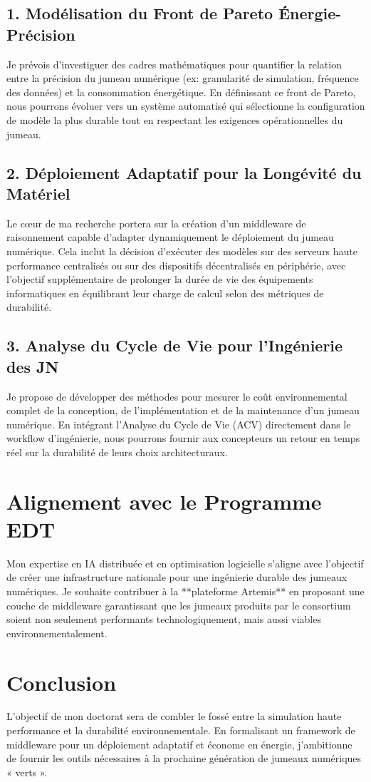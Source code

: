 \documentclass[11pt,a4paper]{article}
\begin{document}
\subsection{1. Modélisation du Front de Pareto Énergie-Précision}
Je prévois d'investiguer des cadres mathématiques pour quantifier la relation entre la précision du jumeau numérique (ex: granularité de simulation, fréquence des données) et la consommation énergétique. En définissant ce front de Pareto, nous pourrons évoluer vers un système automatisé qui sélectionne la configuration de modèle la plus durable tout en respectant les exigences opérationnelles du jumeau.

\subsection{2. Déploiement Adaptatif pour la Longévité du Matériel}
Le cœur de ma recherche portera sur la création d'un middleware de raisonnement capable d'adapter dynamiquement le déploiement du jumeau numérique. Cela inclut la décision d'exécuter des modèles sur des serveurs haute performance centralisés ou sur des dispositifs décentralisés en périphérie, avec l'objectif supplémentaire de prolonger la durée de vie des équipements informatiques en équilibrant leur charge de calcul selon des métriques de durabilité.

\subsection{3. Analyse du Cycle de Vie pour l'Ingénierie des JN}
Je propose de développer des méthodes pour mesurer le coût environnemental complet de la conception, de l'implémentation et de la maintenance d'un jumeau numérique. En intégrant l'Analyse du Cycle de Vie (ACV) directement dans le workflow d'ingénierie, nous pourrons fournir aux concepteurs un retour en temps réel sur la durabilité de leurs choix architecturaux.

\section{Alignement avec le Programme EDT}
Mon expertise en IA distribuée et en optimisation logicielle s'aligne avec l'objectif de créer une infrastructure nationale pour une ingénierie durable des jumeaux numériques. Je souhaite contribuer à la **plateforme Artemis** en proposant une couche de middleware garantissant que les jumeaux produits par le consortium soient non seulement performants technologiquement, mais aussi viables environnementalement.

\section{Conclusion}
L'objectif de mon doctorat sera de combler le fossé entre la simulation haute performance et la durabilité environnementale. En formalisant un framework de middleware pour un déploiement adaptatif et économe en énergie, j'ambitionne de fournir les outils nécessaires à la prochaine génération de jumeaux numériques « verts ».
\end{document}
